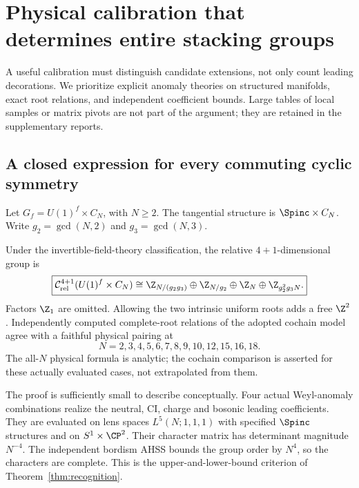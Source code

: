 \section{Physical calibration that determines entire stacking groups}\label{sec:calibration}
A useful calibration must distinguish candidate extensions, not only count leading decorations. We prioritize explicit anomaly theories on structured manifolds, exact root relations, and independent coefficient bounds. Large tables of local samples or matrix pivots are not part of the argument; they are retained in the supplementary reports.

\subsection{A closed expression for every commuting cyclic symmetry}\label{v14:cyclic}
Let $G_f=U(1)^f\times C_N$, with $N\ge2$. The tangential structure is $\Spinc\times C_N$. Write $g_2=\gcd(N,2)$ and $g_3=\gcd(N,3)$.
\begin{theorem}\label{thm:all-cyclic}\label{v14:cyclicsize}
Under the invertible-field-theory classification, the relative $4+1$-dimensional group is
\begin{equation}\label{eq:all-cyclic}
\boxed{\mathcal C^{4+1}_{\mathrm{rel}}(U(1)^f\times C_N)
\cong
\Z_{N/(g_2g_3)}\oplus\Z_{N/g_2}\oplus\Z_N\oplus\Z_{g_2^2g_3N}.}
\end{equation}
Factors $\Z_1$ are omitted. Allowing the two intrinsic uniform roots adds a free $\Z^2$. Independently computed complete-root relations of the adopted cochain model agree with a faithful physical pairing at
\[
N=2,3,4,5,6,7,8,9,10,12,15,16,18.
\]
The all-$N$ physical formula is analytic; the cochain comparison is asserted for these actually evaluated cases, not extrapolated from them.
\end{theorem}

The proof is sufficiently small to describe conceptually. Four actual Weyl-anomaly combinations realize the neutral, CI, charge and bosonic leading coefficients. They are evaluated on lens spaces $L^5(N;1,1,1)$ with specified $\Spinc$ structures and on $S^1\times\CP^2$. Their character matrix has determinant magnitude $N^{-4}$. The independent bordism AHSS bounds the group order by $N^4$, so the characters are complete. This is the upper-and-lower-bound criterion of Theorem~\ref{thm:recognition}.

